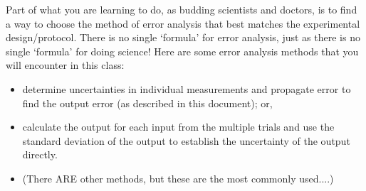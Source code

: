Part of what you are learning to do, as budding scientists and doctors, is to find a way to choose the method of error analysis that best matches the experimental design/protocol. 
There is no single `formula' for error analysis, just as there is no single `formula' for doing science! 
Here are some error analysis methods that you will encounter in this class:
\begin{itemize}
\item determine uncertainties in individual measurements and propagate error to find the output error (as described in this document); or,
\item calculate the output for each input from the multiple trials and use the standard deviation of the output to establish the uncertainty of the output directly.
\item (There ARE other methods, but these are the most commonly used....)
\end{itemize}